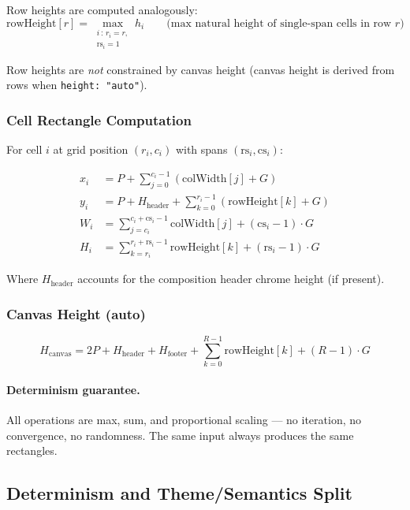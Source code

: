 Row heights are computed analogously:
\[
  \text{rowHeight}[r] = \max_{\substack{i \,:\, r_i = r,\\ \text{rs}_i = 1}} h_i
  \qquad \text{(max natural height of single-span cells in row } r\text{)}
\]

Row heights are \emph{not} constrained by canvas height (canvas height is derived from rows when \texttt{height: "auto"}).

\subsubsection{Cell Rectangle Computation}

For cell $i$ at grid position $(r_i, c_i)$ with spans $(\text{rs}_i, \text{cs}_i)$:

\begin{align}
  x_i &= P + \sum_{j=0}^{c_i - 1} (\text{colWidth}[j] + G) \\
  y_i &= P + H_{\text{header}} + \sum_{k=0}^{r_i - 1} (\text{rowHeight}[k] + G) \\
  W_i &= \sum_{j=c_i}^{c_i + \text{cs}_i - 1} \text{colWidth}[j] + (\text{cs}_i - 1) \cdot G \\
  H_i &= \sum_{k=r_i}^{r_i + \text{rs}_i - 1} \text{rowHeight}[k] + (\text{rs}_i - 1) \cdot G
\end{align}

Where $H_{\text{header}}$ accounts for the composition header chrome height (if present).

\subsubsection{Canvas Height (auto)}

\[
  H_{\text{canvas}} = 2P + H_{\text{header}} + H_{\text{footer}} + \sum_{k=0}^{R-1} \text{rowHeight}[k] + (R-1) \cdot G
\]

\paragraph{Determinism guarantee.}
All operations are max, sum, and proportional scaling --- no iteration, no convergence, no randomness.  The same input always produces the same rectangles.

\subsection{Determinism and Theme/Semantics Split}
\label{sec:composition-theme}

